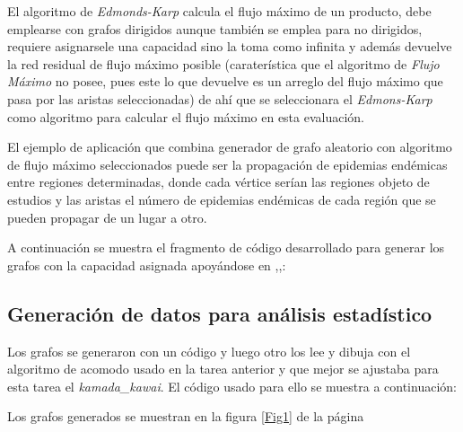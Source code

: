 \documentclass{article}
\begin{document}
El algoritmo de \textit{Edmonds-Karp} calcula el flujo máximo de un producto, debe emplearse con grafos dirigidos aunque también se emplea para no dirigidos, requiere asignarsele una capacidad sino la toma como infinita \cite{ek} y además devuelve la red residual de flujo máximo posible (caraterística que el algoritmo de \textit{Flujo Máximo} no posee, pues este lo que devuelve es un arreglo del flujo máximo que pasa por las aristas seleccionadas) de ahí que se seleccionara el \textit{Edmons-Karp} como algoritmo para calcular el flujo máximo en esta evaluación. 

El ejemplo de aplicación que combina generador de grafo aleatorio con algoritmo de flujo máximo seleccionados puede ser la propagación de epidemias endémicas entre regiones determinadas, donde cada vértice serían las regiones objeto de estudios y las aristas el número de epidemias endémicas de cada región que se pueden propagar de un lugar a otro.

A continuación se muestra el fragmento de código desarrollado para generar los grafos con la capacidad asignada apoyándose en \cite{tutorialpython},\cite{truncnorm},\cite{addeges}:

\newpage


\subsection{Generación de datos para análisis estadístico} 

Los grafos se generaron con un código y luego otro los lee y dibuja con el algoritmo de acomodo usado en la tarea anterior y que mejor se ajustaba para esta tarea el \textit{kamada\_kawai}. El código usado para ello se muestra a continuación:

\newpage


Los grafos generados se muestran en la figura \ref{Fig1} de la página \pageref{Fig1}
\end{document}
